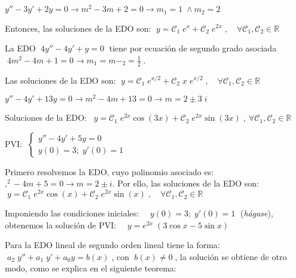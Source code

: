 \vspace{4mm}

\begin{ejem}
$y''-3y'+2y=0 \to m^2-3m+2=0 \to m_1=1 \; \wedge m_2=2\; $

Entonces, las soluciones de la EDO son: $\; y=\mathcal{C}_1\; e^x +\mathcal{C}_2\; e^{2x}\; , \quad \forall \mathcal{C}_1,\mathcal{C}_2 \in \mathbb R$  	
\end{ejem}

\begin{ejem}
La EDO $\; 4y''-4y'+y=0\; $ tiene por ecuación de segundo grado asociada $\; 4m^2-4m+1=0 \to m_1=m-_2=\frac 1 2 \; $.

Las soluciones de la EDO son: $\; y=\mathcal{C}_1\; e^{x/2} + \mathcal{C}_2\;x\; e^{x/2} \; , \quad \forall \mathcal{C}_1,\mathcal{C}_2 \in \mathbb R$
\end{ejem}



\begin{ejem}
$y''-4y'+13y=0 \to m^2-4m+13=0 \to 	m=2\pm 3\; i$

\noindent Soluciones de la EDO: $\ \; y= \mathcal{C}_1\; e^{2x} \cos (3x) + \mathcal{C}_2\; e^{2x} \sin  (3x) \; , \ \forall \mathcal{C}_1,\mathcal{C}_2 \in \mathbb R$
\end{ejem}



\begin{ejem}
PVI: $\; \begin{cases} y''-4y'+5y=0 \\ y(0)=3; \; y'(0)=1 \end{cases}$

Primero resolvemos la EDO, cuyo polinomio asociado es: $,^2-4m+5=0 \to m=2\pm  i$. Por ello, las soluciones de la EDO son:
$\; y= \mathcal{C}_1\; e^{2x} \cos (x) + \mathcal{C}_2\; e^{2x} \sin  (x) \; , \quad \forall \mathcal{C}_1,\mathcal{C}_2 \in \mathbb R$

Imponiendo las condiciones iniciales: $\quad y(0)=3; \; y'(0)=1 \; $ (\emph{hágase}), obtenemos la solución de PVI: $\quad y=e^{2x}\; (3\cos x-5\sin x)$
	
\end{ejem}

\vspace{3mm}

Para la EDO lineal de segundo orden lineal tiene la forma: $\; a_2\; y'' + a_1	\; y' + a_0 y= b(x)\; $, con $\; b(x) \neq  0\; $, la solución se obtiene de otro modo, como se explica en el siguiente teorema:


